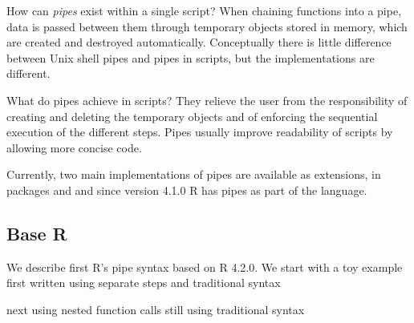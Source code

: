 \documentclass[krantz2]{krantz}\usepackage{knitr}
\begin{document}
How can \emph{pipes} exist within a single \Rlang script? When chaining functions into a pipe, data is passed between them through temporary \Rlang objects stored in memory, which are created and destroyed automatically. Conceptually there is little difference between Unix shell pipes and pipes in \Rlang scripts, but the implementations are different.

What do pipes achieve in \Rlang scripts? They relieve the user from the responsibility of creating and deleting the temporary objects and of enforcing the sequential execution of the different steps. Pipes usually improve readability of scripts by allowing more concise code.

Currently, two main implementations of pipes are available as \Rlang extensions, in packages  and  and since version 4.1.0 R has pipes as part of the language.


\subsection{Base R}
We describe first R's pipe syntax based on R 4.2.0.
We start with a toy example first written using separate steps and traditional \Rlang syntax

\begin{knitrout}\footnotesize
{}\color{fgcolor}\begin{kframe}
\begin{alltt}
 \hlkwb{<-} \hlopt{:}
 \hlkwb{<-} 
 \hlkwb{<-} 
 
\end{alltt}
\end{kframe}
\end{knitrout}

next using nested function calls still using traditional \Rlang syntax

\begin{knitrout}\footnotesize
{}\color{fgcolor}\begin{kframe}
\begin{alltt}
 \hlkwb{<-} \hlstd{(}
\end{alltt}
\end{kframe}
\end{knitrout}
\end{document}
